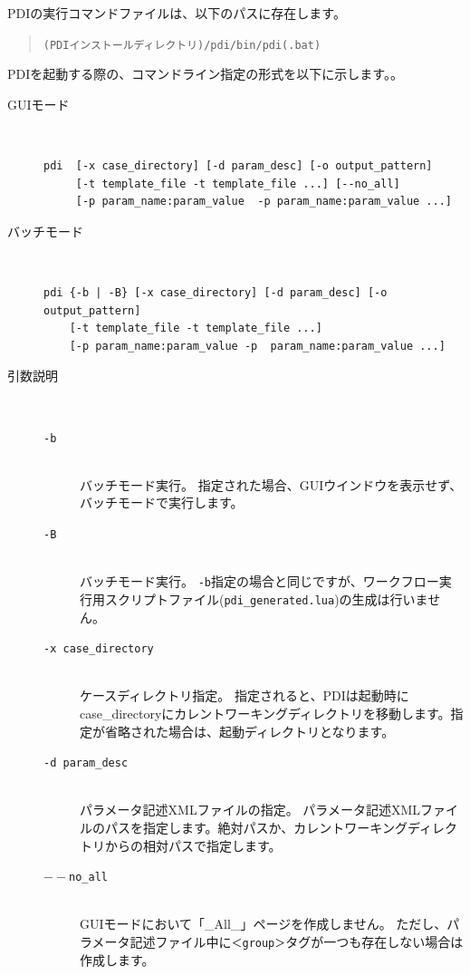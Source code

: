 \documentclass[a4paper,11pt]{jarticle}
\begin{document}
PDIの実行コマンドファイルは、以下のパスに存在します。

\begin{quote}
{\tt (PDIインストールディレクトリ)/pdi/bin/pdi(.bat)}
\end{quote}

PDIを起動する際の、コマンドライン指定の形式を以下に示します。。

\begin{description}
\item[GUIモード] {\ }
\begin{verbatim}
pdi  [-x case_directory] [-d param_desc] [-o output_pattern]
     [-t template_file -t template_file ...] [--no_all]
     [-p param_name:param_value  -p param_name:param_value ...]
\end{verbatim}

\item[バッチモード] {\ }
\begin{verbatim}
pdi {-b | -B} [-x case_directory] [-d param_desc] [-o output_pattern]
    [-t template_file -t template_file ...]
    [-p param_name:param_value -p  param_name:param_value ...]
\end{verbatim}

\item[引数説明] {\ }
\begin{description}
\item[{\tt -b}] {\ }\\
バッチモード実行。
指定された場合、GUIウインドウを表示せず、バッチモードで実行します。
\item[{\tt -B}] {\ }\\
バッチモード実行。
{\tt -b}指定の場合と同じですが、ワークフロー実行用スクリプトファイル({\tt pdi\_generated.lua})の生成は行いません。
\item[{\tt -x  case\_directory}] {\ }\\
ケースディレクトリ指定。
指定されると、PDIは起動時にcase\_directoryにカレントワーキングディレクトリを移動します。指定が省略された場合は、起動ディレクトリとなります。

\item[{\tt -d  param\_desc}] {\ }\\
パラメータ記述XMLファイルの指定。
パラメータ記述XMLファイルのパスを指定します。絶対パスか、カレントワーキングディレクトリからの相対パスで指定します。

\item[{\tt $--$no\_all}] {\ }\\ 
GUIモードにおいて「\_All\_」ページを作成しません。
ただし、パラメータ記述ファイル中に{\tt ＜group＞}タグが一つも存在しない場合は
作成します。


\end{description}
\end{description}
\end{document}
